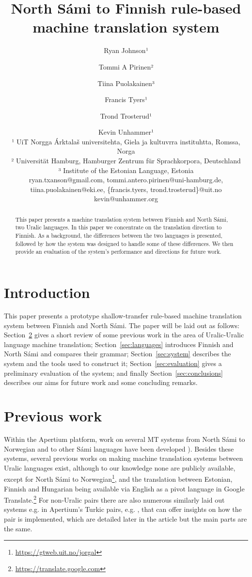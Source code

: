 \documentclass[free]{flammie}
\title{North Sámi to Finnish rule-based machine translation
system\footnotepubrights{
    Originally published in NoDaLiDa 2017 in Göteborg.
    Official vresion available from ACL anthology:
    \url{http://aclweb.org/anthology/W17-0214} as well as Linköping university
    repository: \url{http://www.ep.liu.se/ecp/article.asp?issue=131&article=014}
Authors are listed in alphabetical order}
}
\author{Ryan Johnson¹ \and Tommi A Pirinen² \and Tiina Puolakainen³ \and Francis
Tyers¹ \and Trond Trosterud¹ \and Kevin Unhammer¹\\
¹ UiT Norgga \'Arktala\v{s} universitehta, Giela ja kultuvrra instituhtta, Romssa, Norga \\
² Universit\"{a}t Hamburg, Hamburger Zentrum f\"{u}r Sprachkorpora, Deutschland \\
³ Institute of the Estonian Language, Estonia\\
ryan.txanson@gmail.com, tommi.antero.pirinen@uni-hamburg.de, \\ tiina.puolakainen@eki.ee,
\{francis.tyers, trond.trosterud\}@uit.no \\
kevin@unhammer.org
}
\begin{document}
\maketitle
\begin{abstract}
This paper presents a machine translation system between Finnish and North Sámi, two Uralic languages.
In this paper we concentrate on the translation direction to Finnish.
%
As a background, the differences between the two languages is presented, followed by how the system was designed to handle some of these differences.
We then provide an evaluation of the system's performance and directions for future work.
\end{abstract}

%
%

\section{Introduction}
\label{sec:introduction}
This paper presents a prototype shallow-transfer rule-based machine translation system between Finnish and North Sámi.
The paper will be laid out as follows: Section\ \ref{sec:previous-work} gives a short review of some previous work in the area of Uralic-Uralic language machine translation; Section\ \ref{sec:languages} introduces Finnish and North Sámi and compares their grammar; Section\ \ref{sec:system} describes the system and the tools used to construct it; Section\ \ref{sec:evaluation} gives a preliminary evaluation of the system; and finally Section\ \ref{sec:conclusions} describes our aims for future work and some concluding remarks.

\section{Previous work}
\label{sec:previous-work}

Within the Apertium platform, work on several MT systems from North Sámi to Norwegian and to other Sámi languages have been developed \cite{tyers09,wiechetek10,trosterud12,smesma}).
Besides these systems, several previous works on making machine translation systems between Uralic languages exist, although to our knowledge none are publicly available, except for North Sámi to Norwegian\footnote{\url{https://gtweb.uit.no/jorgal}}, and the translation between Estonian, Finnish and Hungarian being available via English as a pivot language in Google Translate.\footnote{\url{https://translate.google.com}}
For non-Uralic pairs there are also numerous similarly laid out systems e.g. in Apertium's Turkic pairs, e.g. \cite{salimzyanov2013free}, that can offer insights on how the pair is implemented, which are detailed later in the article but the main parts are the same.
\end{document}

